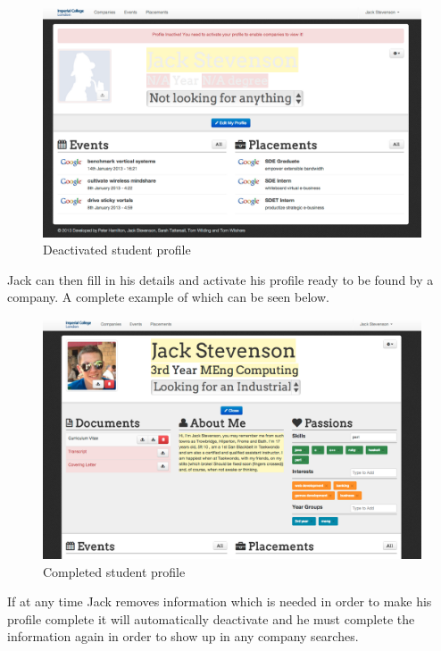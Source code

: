     \begin{figure}[H]\centering
    \includegraphics[scale=0.3]{images/user_experiences/student/sign_up_deactivate}
    \caption{Deactivated student profile}
    \end{figure}

    Jack can then fill in his details and activate his profile ready to be found by a company.
    A complete example of which can be seen below.
    
    \begin{figure}[H]\centering
    \includegraphics[scale=0.3]{images/user_experiences/student/edit_complete}
    \caption{Completed student profile}
    \end{figure}

    If at any time Jack removes information which is needed in order to make his profile complete it will automatically deactivate and he must complete the information again in order to show up in any company searches.

